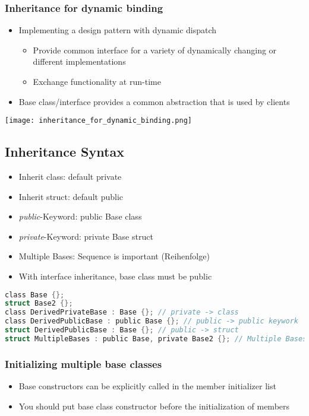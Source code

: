 \subsubsection{Inheritance for dynamic binding}
\begin{itemize}
    \item Implementing a design pattern with dynamic dispatch
    \begin{itemize}
        \item Provide common interface for a variety of dynamically changing or different implementations
        \item Exchange functionality at run-time
    \end{itemize}
    \item Base class/interface provides a common abstraction that is used by clients
\end{itemize}
\begin{center}
    \texttt{[image: inheritance\_for\_dynamic\_binding.png]}
\end{center}

\subsection{Inheritance Syntax}
\begin{itemize}
    \item Inherit class: default private
    \item Inherit struct: default public
    \item \textit{public}-Keyword: public Base class
    \item \textit{private}-Keyword: private Base struct
    \item Multiple Bases: Sequence is important (Reihenfolge)
    \item With interface inheritance, base class must be public
\end{itemize}

\begin{lstlisting}[style=frame, style= linenumbers, language=C]
class Base {};
struct Base2 {};
class DerivedPrivateBase : Base {}; // private -> class
class DerivedPublicBase : public Base {}; // public -> public keywork
struct DerivedPublicBase : Base {}; // public -> struct
struct MultipleBases : public Base, private Base2 {}; // Multiple Bases
\end{lstlisting}

\pagebreak

\subsubsection{Initializing multiple base classes}
\begin{itemize}
    \item Base constructors can be explicitly called in the member initializer list
    \item You should put base class constructor before the initialization of members
\end{itemize}

